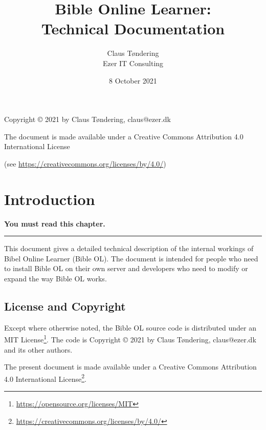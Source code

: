 \documentclass[11pt,oneside,a4paper]{memoir}
\title{Bible Online Learner:\\Technical Documentation}
\author{Claus Tøndering\\Ezer IT Consulting}
\date{8 October 2021}
\begin{document}
\begin{titlingpage*}
\maketitle

\begin{center}
Copyright © 2021 by Claus Tøndering, claus@ezer.dk

\vspace{5mm}

The document is made available under a Creative Commons Attribution 4.0 International License

(see \url{https://creativecommons.org/licenses/by/4.0/})
\end{center}
\end{titlingpage*}


\clearpage
\tableofcontents
{} %

\chapter{Introduction}

\textbf{You must read this chapter.}
\plainbreak{3}

This document gives a detailed technical description of the internal workings of Bibel Online
Learner (Bible OL). The document is intended for people who need to install Bible OL on their own
server and developers who need to modify or expand the way Bible OL works.

\section{License and Copyright}

Except where otherwise noted, the Bible OL source code is distributed under an MIT
License\footnote{\url{https://opensource.org/licenses/MIT}}. The code is Copyright © 2021 by Claus
Tøndering, claus@ezer.dk and its other authors.

The present document is made available under a Creative Commons Attribution 4.0 International
License\footnote{\url{https://creativecommons.org/licenses/by/4.0/}}.


\end{document}
